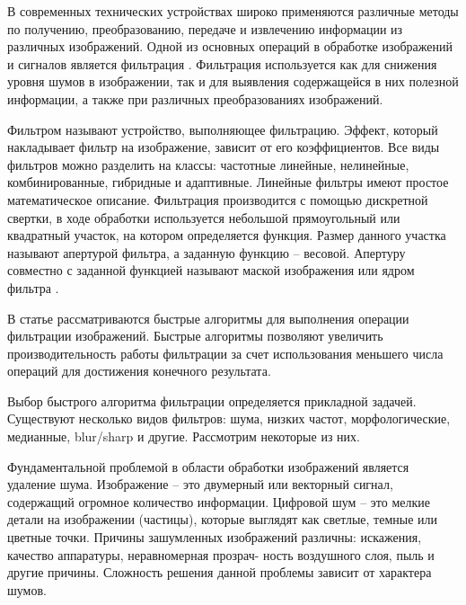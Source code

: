 В современных технических устройствах широко применяются различные методы по получению, преобразованию, передаче и извлечению информации из различных изображений. Одной из основных операций в обработке изображений и сигналов является фильтрация \cite{gonzalez2018digital}. 
Фильтрация используется как для снижения уровня шумов в изображении, так и для выявления содержащейся в них полезной информации, а также при различных преобразованиях изображений.

Фильтром называют устройство, выполняющее фильтрацию. Эффект, который накладывает фильтр на изображение, зависит от его коэффициентов. Все виды фильтров можно разделить на классы: частотные линейные, нелинейные, комбинированные, гибридные и адаптивные. Линейные фильтры имеют простое математическое описание. Фильтрация производится с помощью дискретной свертки, в ходе обработки используется небольшой прямоугольный или квадратный участок, на котором определяется функция. Размер данного участка называют апертурой фильтра, а заданную функцию – весовой. Апертуру совместно с заданной функцией называют маской изображения или ядром фильтра \cite{bondina2012comparative}.

В статье \cite{application_of_fast2018} рассматриваются быстрые алгоритмы для выполнения операции фильтрации изображений. Быстрые алгоритмы позволяют увеличить производительность работы фильтрации за счет использования меньшего числа операций для достижения конечного результата.

Выбор быстрого алгоритма фильтрации определяется прикладной задачей. Существуют несколько видов фильтров: шума, низких частот, морфологические, медианные, blur/sharp и другие. Рассмотрим некоторые из них.

Фундаментальной проблемой в области обработки изображений является удаление шума. Изображение – это двумерный или векторный сигнал, содержащий огромное количество информации. Цифровой шум – это мелкие детали на изображении (частицы), которые выглядят как светлые, темные или цветные точки. Причины зашумленных изображений различны: искажения, качество аппаратуры, неравномерная прозрач-
ность воздушного слоя, пыль и другие причины. Сложность решения данной проблемы зависит от характера шумов.

